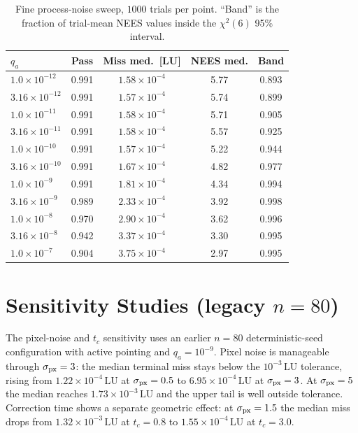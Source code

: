 \documentclass[10pt]{article}
\newcommand{\LU}{\mathrm{LU}}
\newcommand{\chisq}{\chi^2}
\begin{document}
\begin{table}[h]
\centering
\caption{Fine process-noise sweep, $1000$ trials per point.  ``Band'' is the fraction of trial-mean NEES values inside the $\chisq(6)$ 95\% interval.}
\label{tab:S-qacc}
\footnotesize
\begin{tabular}{@{}lcccc@{}}
\toprule
$q_a$ & Pass & Miss med.\ [LU] & NEES med. & Band \\
\midrule
$1.0\times10^{-12}$  & 0.991 & $1.58\times10^{-4}$ & 5.77 & 0.893 \\
$3.16\times10^{-12}$ & 0.991 & $1.57\times10^{-4}$ & 5.74 & 0.899 \\
$1.0\times10^{-11}$  & 0.991 & $1.58\times10^{-4}$ & 5.71 & 0.905 \\
$3.16\times10^{-11}$ & 0.991 & $1.58\times10^{-4}$ & 5.57 & 0.925 \\
$1.0\times10^{-10}$  & 0.991 & $1.57\times10^{-4}$ & 5.22 & 0.944 \\
$3.16\times10^{-10}$ & 0.991 & $1.67\times10^{-4}$ & 4.82 & 0.977 \\
$1.0\times10^{-9}$   & 0.991 & $1.81\times10^{-4}$ & 4.34 & 0.994 \\
$3.16\times10^{-9}$  & 0.989 & $2.33\times10^{-4}$ & 3.92 & 0.998 \\
$1.0\times10^{-8}$   & 0.970 & $2.90\times10^{-4}$ & 3.62 & 0.996 \\
$3.16\times10^{-8}$  & 0.942 & $3.37\times10^{-4}$ & 3.30 & 0.995 \\
$1.0\times10^{-7}$   & 0.904 & $3.75\times10^{-4}$ & 2.97 & 0.995 \\
\bottomrule
\end{tabular}
\end{table}

\section{Sensitivity Studies (legacy $n=80$)}
The pixel-noise and $t_c$ sensitivity uses an earlier $n=80$ deterministic-seed configuration with active pointing and $q_a=10^{-9}$.  Pixel noise is manageable through $\sigma_{\rm px}=3$: the median terminal miss stays below the $10^{-3}\,\LU$ tolerance, rising from $1.22\times10^{-4}\,\LU$ at $\sigma_{\rm px}=0.5$ to $6.95\times10^{-4}\,\LU$ at $\sigma_{\rm px}=3$.  At $\sigma_{\rm px}=5$ the median reaches $1.73\times10^{-3}\,\LU$ and the upper tail is well outside tolerance.  Correction time shows a separate geometric effect: at $\sigma_{\rm px}=1.5$ the median miss drops from $1.32\times10^{-3}\,\LU$ at $t_c=0.8$ to $1.55\times10^{-4}\,\LU$ at $t_c=3.0$.
\end{document}
